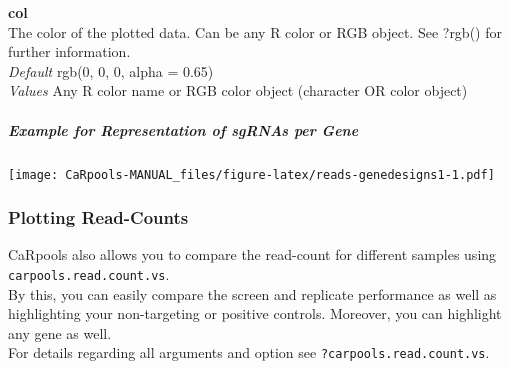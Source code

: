 \documentclass[]{article}
\newenvironment{Shaded}{\begin{snugshade}}{\end{snugshade}}
\newcommand{\KeywordTok}[1]{\textcolor[rgb]{0.13,0.29,0.53}{\textbf{{#1}}}}
\newcommand{\DataTypeTok}[1]{\textcolor[rgb]{0.13,0.29,0.53}{{#1}}}
\newcommand{\DecValTok}[1]{\textcolor[rgb]{0.00,0.00,0.81}{{#1}}}
\newcommand{\StringTok}[1]{\textcolor[rgb]{0.31,0.60,0.02}{{#1}}}
\newcommand{\NormalTok}[1]{{#1}}
\let\oldsubparagraph\subparagraph
\renewcommand{\subparagraph}[1]{\oldsubparagraph{#1}\mbox{}}
\begin{document}
\textbf{col}\\
The color of the plotted data. Can be any R color or RGB object. See
?rgb() for further information.\\
\emph{Default} rgb(0, 0, 0, alpha = 0.65)\\
\emph{Values} Any R color name or RGB color object (character OR color
object)

\subparagraph{Example for Representation of sgRNAs per
Gene}\label{example-for-representation-of-sgrnas-per-gene}

\begin{Shaded}
\end{Shaded}

\texttt{[image: CaRpools-MANUAL\_files/figure-latex/reads-genedesigns1-1.pdf]}

\subsubsection{Plotting Read-Counts}\label{plotting-read-counts}

CaRpools also allows you to compare the read-count for different samples
using \texttt{carpools.read.count.vs}.\\
By this, you can easily compare the screen and replicate performance as
well as highlighting your non-targeting or positive controls. Moreover,
you can highlight any gene as well.\\
For details regarding all arguments and option see
\texttt{?carpools.read.count.vs}.
\end{document}
